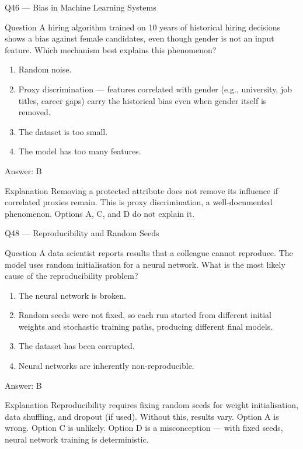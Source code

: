 \documentclass[aspectratio=169,8pt]{beamer}
\begin{document}
	\begin{frame}{Q46 --- Bias in Machine Learning Systems}
		\begin{block}{Question}
			A hiring algorithm trained on 10 years of historical hiring decisions shows a bias against female candidates, even though gender is not an input feature. Which mechanism best explains this phenomenon?
		\end{block}
		\begin{enumerate}
			\item Random noise.
			\item Proxy discrimination --- features correlated with gender (e.g., university, job titles, career gaps) carry the historical bias even when gender itself is removed.
			\item The dataset is too small.
			\item The model has too many features.
		\end{enumerate}
		\begin{exampleblock}{Answer: B}\end{exampleblock}
		\begin{block}{Explanation}
			Removing a protected attribute does not remove its influence if correlated proxies remain. This is proxy discrimination, a well-documented phenomenon. Options A, C, and D do not explain it.
		\end{block}
	\end{frame}
	
	
	\begin{frame}{Q48 --- Reproducibility and Random Seeds}
		\begin{block}{Question}
			A data scientist reports results that a colleague cannot reproduce. The model uses random initialisation for a neural network. What is the most likely cause of the reproducibility problem?
		\end{block}
		\begin{enumerate}
			\item The neural network is broken.
			\item Random seeds were not fixed, so each run started from different initial weights and stochastic training paths, producing different final models.
			\item The dataset has been corrupted.
			\item Neural networks are inherently non-reproducible.
		\end{enumerate}
		\begin{exampleblock}{Answer: B}\end{exampleblock}
		\begin{block}{Explanation}
			Reproducibility requires fixing random seeds for weight initialisation, data shuffling, and dropout (if used). Without this, results vary. Option A is wrong. Option C is unlikely. Option D is a misconception --- with fixed seeds, neural network training is deterministic.
		\end{block}
	\end{frame}
	
\end{document}
